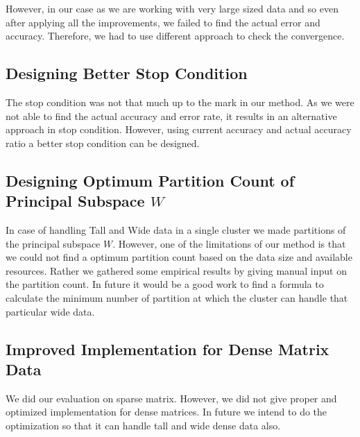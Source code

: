 However, in our case as we are working with very large sized data and so even after applying all the improvements, we failed to find the actual error and accuracy. Therefore, we had to use different approach to check the convergence.
\subsection{Designing Better Stop Condition}
The stop condition was not that much up to the mark in our method. As we were not able to find the actual accuracy and error rate, it results in an alternative approach in stop condition. However, using current accuracy and actual accuracy ratio a better stop condition can be designed.
\subsection{Designing Optimum Partition Count of Principal Subspace $W$}
In case of handling Tall and Wide data in a single cluster we made partitions of the principal subspace $W$. However, one of the limitations of our method is that we could not find a optimum partition count based on the data size and available resources. Rather we gathered some empirical results by giving manual input on the partition count. In future it would be a good work to find a formula to calculate the minimum number of partition at which the cluster  can handle that particular wide data.
\subsection{Improved Implementation for Dense Matrix Data}
We did our evaluation on sparse matrix. However, we did not give proper and optimized implementation for dense matrices. In future we intend to do the optimization so that it can handle tall and wide dense data also.

\endinput
